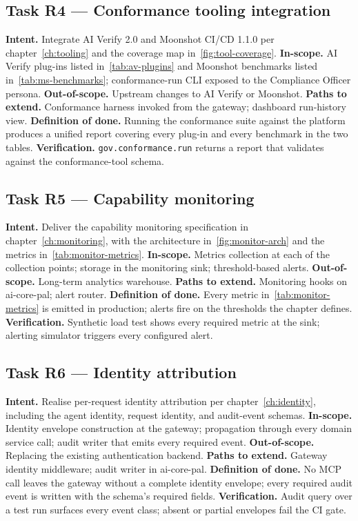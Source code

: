 \documentclass[11pt,a4paper,twoside]{report}
\begin{document}
\subsection*{Task R4 --- Conformance tooling integration}
\textbf{Intent.} Integrate AI Verify 2.0 and Moonshot CI/CD 1.1.0
per chapter~\ref{ch:tooling} and the coverage map
in~\ref{fig:tool-coverage}.
\textbf{In-scope.} AI Verify plug-ins listed in~\ref{tab:av-plugins}
and Moonshot benchmarks listed in~\ref{tab:ms-benchmarks};
conformance-run CLI exposed to the Compliance Officer persona.
\textbf{Out-of-scope.} Upstream changes to AI Verify or Moonshot.
\textbf{Paths to extend.} Conformance harness invoked from the
gateway; dashboard run-history view.
\textbf{Definition of done.} Running the conformance suite against
the platform produces a unified report covering every plug-in and
every benchmark in the two tables.
\textbf{Verification.} \texttt{gov.conformance.run} returns a report
that validates against the conformance-tool schema.

\subsection*{Task R5 --- Capability monitoring}
\textbf{Intent.} Deliver the capability monitoring specification in
chapter~\ref{ch:monitoring}, with the architecture
in~\ref{fig:monitor-arch} and the metrics in~\ref{tab:monitor-metrics}.
\textbf{In-scope.} Metrics collection at each of the collection
points; storage in the monitoring sink; threshold-based alerts.
\textbf{Out-of-scope.} Long-term analytics warehouse.
\textbf{Paths to extend.} Monitoring hooks on ai-core-pal; alert
router.
\textbf{Definition of done.} Every metric in~\ref{tab:monitor-metrics}
is emitted in production; alerts fire on the thresholds the chapter
defines.
\textbf{Verification.} Synthetic load test shows every required
metric at the sink; alerting simulator triggers every configured
alert.

\subsection*{Task R6 --- Identity attribution}
\textbf{Intent.} Realise per-request identity attribution per
chapter~\ref{ch:identity}, including the agent identity, request
identity, and audit-event schemas.
\textbf{In-scope.} Identity envelope construction at the gateway;
propagation through every domain service call; audit writer that
emits every required event.
\textbf{Out-of-scope.} Replacing the existing authentication
backend.
\textbf{Paths to extend.} Gateway identity middleware; audit writer
in ai-core-pal.
\textbf{Definition of done.} No MCP call leaves the gateway without
a complete identity envelope; every required audit event is written
with the schema's required fields.
\textbf{Verification.} Audit query over a test run surfaces every
event class; absent or partial envelopes fail the CI gate.
\end{document}
